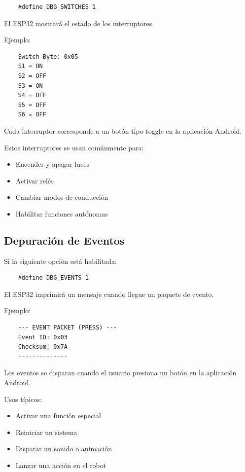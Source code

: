 \begin{verbatim}
    #define DBG_SWITCHES 1
\end{verbatim}

El ESP32 mostrará el estado de los interruptores.

Ejemplo:

\begin{verbatim}
    Switch Byte: 0x05
    S1 = ON
    S2 = OFF
    S3 = ON
    S4 = OFF
    S5 = OFF
    S6 = OFF
\end{verbatim}

Cada interruptor corresponde a un botón tipo toggle en la aplicación Android.

Estos interruptores se usan comúnmente para:

\begin{itemize}
    \item Encender y apagar luces
    \item Activar relés
    \item Cambiar modos de conducción
    \item Habilitar funciones autónomas
\end{itemize}

\subsection{Depuración de Eventos}

Si la siguiente opción está habilitada:

\begin{verbatim}
    #define DBG_EVENTS 1
\end{verbatim}

El ESP32 imprimirá un mensaje cuando llegue un paquete de evento.

Ejemplo:

\begin{verbatim}
    --- EVENT PACKET (PRESS) ---
    Event ID: 0x03
    Checksum: 0x7A
    --------------
\end{verbatim}

Los eventos se disparan cuando el usuario presiona un botón en la aplicación Android.

Usos típicos:

\begin{itemize}
    \item Activar una función especial
    \item Reiniciar un sistema
    \item Disparar un sonido o animación
    \item Lanzar una acción en el robot
\end{itemize}

